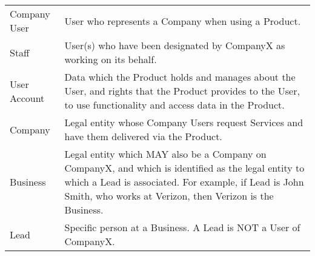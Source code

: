 \begin{longtable}{lp{7.5cm}}
Company User               & User who represents a Company when using a Product.                                                                                                                                                                                                                                                                                                                       \\
Staff                      & User(s) who have been designated by CompanyX as working on its behalf.                                                                                                                                                                                                                                                                                                    \\
User Account               & Data which the Product holds and manages about the User, and rights that the Product provides to the User, to use functionality and access data in the Product.                                                                                                                                                                                                           \\
Company                    & Legal entity whose Company Users request Services and have them delivered via the Product.                                                                                                                                                                                                                                                                                \\
Business                   & Legal entity which MAY also be a Company on CompanyX, and which is identified as the legal entity to which a Lead is associated. For example, if Lead is John Smith, who works at Verizon, then Verizon is the Business.                                                                                                                                                  \\
Lead                       & Specific person at a Business. A Lead is NOT a User of CompanyX.                                                                                                                                                                                                                                                                                                          \\

\end{longtable}
